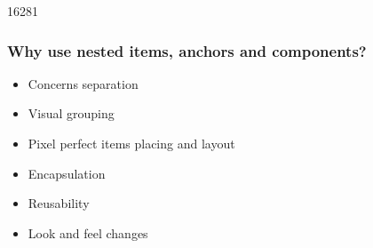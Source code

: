 \begin{slide}{16281}\frametitle{Why use nested items, anchors and components?}

\begin{itemize}
\item Concerns separation
\item Visual grouping
\item Pixel perfect items placing and layout
\item Encapsulation
\item Reusability
\item Look and feel changes
\end{itemize}


\end{slide}






